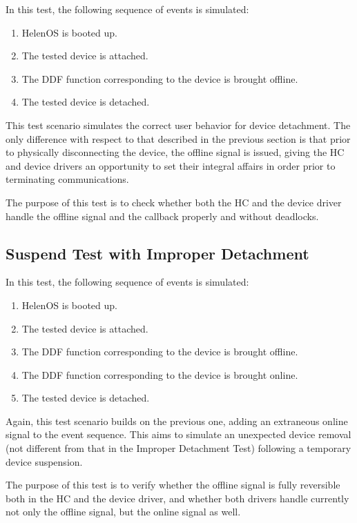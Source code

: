 In this test, the following sequence of events is simulated:
%
\begin{enumerate}
	\item HelenOS is booted up.
	\item The tested device is attached.
	\item The DDF function corresponding to the device is brought offline.
	\item The tested device is detached.
\end{enumerate}

This test scenario simulates the correct user behavior for device detachment. The
only difference with respect to that described in the previous section is that
prior to physically disconnecting the device, the offline signal is issued,
giving the HC and device drivers an opportunity to set their integral affairs in
order prior to terminating communications.

The purpose of this test is to check whether both the HC and the device driver
handle the offline signal and the  callback properly and
without deadlocks.


\subsection{Suspend Test with Improper Detachment}

In this test, the following sequence of events is simulated:
%
\begin{enumerate}
	\item HelenOS is booted up.
	\item The tested device is attached.
	\item The DDF function corresponding to the device is brought offline.
	\item The DDF function corresponding to the device is brought online.
	\item The tested device is detached.
\end{enumerate}

Again, this test scenario builds on the previous one, adding an extraneous
online signal to the event sequence. This aims to simulate an unexpected device
removal (not different from that in the Improper Detachment Test) following a
temporary device suspension.

The purpose of this test is to verify whether the offline signal is fully
reversible both in the HC and the device driver, and whether both drivers handle
currently not only the offline signal, but the online signal as well.


